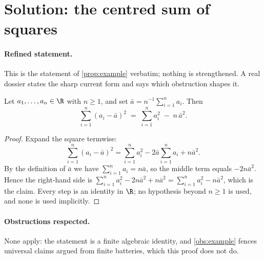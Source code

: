 \documentclass[../main.tex]{subfiles}
\begin{document}

\section*{Solution: the centred sum of squares}
\label{sec:sol-prop-example}

\paragraph{Refined statement.}
This is the statement of \ref{prop:example} verbatim; nothing is strengthened. A
real dossier states the sharp current form and says which obstruction shapes it.

\begin{theorem}
\label{thm:sol-prop-example}
  Let $a_1,\dots,a_n \in \R$ with $n \ge 1$, and set $\bar a = n^{-1}\sum_{i=1}^n a_i$.
  Then
  \[
    \sum_{i=1}^n (a_i - \bar a)^2 \;=\; \sum_{i=1}^n a_i^2 \;-\; n\,\bar a^2 .
  \]
\end{theorem}

\begin{proof}
  Expand the square termwise:
  \[
    \sum_{i=1}^n (a_i - \bar a)^2
      = \sum_{i=1}^n a_i^2 - 2\bar a \sum_{i=1}^n a_i + n \bar a^2 .
  \]
  By the definition of $\bar a$ we have $\sum_{i=1}^n a_i = n \bar a$, so the
  middle term equals $-2 n \bar a^2$. Hence the right-hand side is
  $\sum_{i=1}^n a_i^2 - 2n\bar a^2 + n\bar a^2 = \sum_{i=1}^n a_i^2 - n\bar a^2$,
  which is the claim. Every step is an identity in $\R$; no hypothesis beyond
  $n \ge 1$ is used, and none is used implicitly.
\end{proof}

\paragraph{Obstructions respected.}
None apply: the statement is a finite algebraic identity, and \ref{obs:example}
fences universal claims argued from finite batteries, which this proof does not do.

\end{document}
